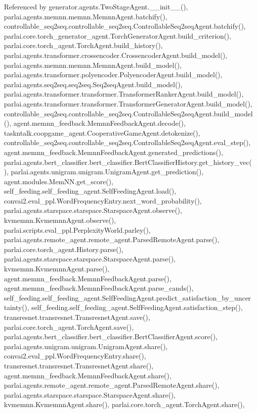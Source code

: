 Referenced by generator.\+agents.\+Two\+Stage\+Agent.\+\_\+\+\_\+init\+\_\+\+\_\+(), parlai.\+agents.\+memnn.\+memnn.\+Memnn\+Agent.\+batchify(), controllable\+\_\+seq2seq.\+controllable\+\_\+seq2seq.\+Controllable\+Seq2seq\+Agent.\+batchify(), parlai.\+core.\+torch\+\_\+generator\+\_\+agent.\+Torch\+Generator\+Agent.\+build\+\_\+criterion(), parlai.\+core.\+torch\+\_\+agent.\+Torch\+Agent.\+build\+\_\+history(), parlai.\+agents.\+transformer.\+crossencoder.\+Crossencoder\+Agent.\+build\+\_\+model(), parlai.\+agents.\+memnn.\+memnn.\+Memnn\+Agent.\+build\+\_\+model(), parlai.\+agents.\+transformer.\+polyencoder.\+Polyencoder\+Agent.\+build\+\_\+model(), parlai.\+agents.\+seq2seq.\+seq2seq.\+Seq2seq\+Agent.\+build\+\_\+model(), parlai.\+agents.\+transformer.\+transformer.\+Transformer\+Ranker\+Agent.\+build\+\_\+model(), parlai.\+agents.\+transformer.\+transformer.\+Transformer\+Generator\+Agent.\+build\+\_\+model(), controllable\+\_\+seq2seq.\+controllable\+\_\+seq2seq.\+Controllable\+Seq2seq\+Agent.\+build\+\_\+model(), agent.\+memnn\+\_\+feedback.\+Memnn\+Feedback\+Agent.\+decode(), taskntalk.\+coopgame\+\_\+agent.\+Cooperative\+Game\+Agent.\+detokenize(), controllable\+\_\+seq2seq.\+controllable\+\_\+seq2seq.\+Controllable\+Seq2seq\+Agent.\+eval\+\_\+step(), agent.\+memnn\+\_\+feedback.\+Memnn\+Feedback\+Agent.\+generated\+\_\+predictions(), parlai.\+agents.\+bert\+\_\+classifier.\+bert\+\_\+classifier.\+Bert\+Classifier\+History.\+get\+\_\+history\+\_\+vec(), parlai.\+agents.\+unigram.\+unigram.\+Unigram\+Agent.\+get\+\_\+prediction(), agent.\+modules.\+Mem\+N\+N.\+get\+\_\+score(), self\+\_\+feeding.\+self\+\_\+feeding\+\_\+agent.\+Self\+Feeding\+Agent.\+load(), convai2.\+eval\+\_\+ppl.\+Word\+Frequency\+Entry.\+next\+\_\+word\+\_\+probability(), parlai.\+agents.\+starspace.\+starspace.\+Starspace\+Agent.\+observe(), kvmemnn.\+Kvmemnn\+Agent.\+observe(), parlai.\+scripts.\+eval\+\_\+ppl.\+Perplexity\+World.\+parley(), parlai.\+agents.\+remote\+\_\+agent.\+remote\+\_\+agent.\+Parsed\+Remote\+Agent.\+parse(), parlai.\+core.\+torch\+\_\+agent.\+History.\+parse(), parlai.\+agents.\+starspace.\+starspace.\+Starspace\+Agent.\+parse(), kvmemnn.\+Kvmemnn\+Agent.\+parse(), agent.\+memnn\+\_\+feedback.\+Memnn\+Feedback\+Agent.\+parse(), agent.\+memnn\+\_\+feedback.\+Memnn\+Feedback\+Agent.\+parse\+\_\+cands(), self\+\_\+feeding.\+self\+\_\+feeding\+\_\+agent.\+Self\+Feeding\+Agent.\+predict\+\_\+satisfaction\+\_\+by\+\_\+uncertainty(), self\+\_\+feeding.\+self\+\_\+feeding\+\_\+agent.\+Self\+Feeding\+Agent.\+satisfaction\+\_\+step(), transresnet.\+transresnet.\+Transresnet\+Agent.\+save(), parlai.\+core.\+torch\+\_\+agent.\+Torch\+Agent.\+save(), parlai.\+agents.\+bert\+\_\+classifier.\+bert\+\_\+classifier.\+Bert\+Classifier\+Agent.\+score(), parlai.\+agents.\+unigram.\+unigram.\+Unigram\+Agent.\+share(), convai2.\+eval\+\_\+ppl.\+Word\+Frequency\+Entry.\+share(), transresnet.\+transresnet.\+Transresnet\+Agent.\+share(), agent.\+memnn\+\_\+feedback.\+Memnn\+Feedback\+Agent.\+share(), parlai.\+agents.\+remote\+\_\+agent.\+remote\+\_\+agent.\+Parsed\+Remote\+Agent.\+share(), parlai.\+agents.\+starspace.\+starspace.\+Starspace\+Agent.\+share(), kvmemnn.\+Kvmemnn\+Agent.\+share(), parlai.\+core.\+torch\+\_\+agent.\+Torch\+Agent.\+share(), 